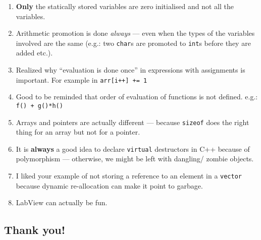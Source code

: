 \documentclass[11pt]{report}
\begin{document}
\begin{enumerate}
	\item \textbf{Only} the statically stored variables are zero initialised and not all the variables.
	\item Arithmetic promotion is done \emph{always} --- even when the types of the variables involved are the same (e.g.: two \texttt{char}s are promoted to \texttt{int}s before they are added etc.).
	\item Realized why ``evaluation is done once'' in expressions with assignments is important. For example in \texttt{arr[i++] += 1}
	\item Good to be reminded that order of evaluation of functions is not defined. e.g.: \texttt{f() + g()*h()}
	\item Arrays and pointers are actually different --- because \texttt{sizeof} does the right thing for an array but not for a pointer.
	\item It is \textbf{always} a good idea to declare \texttt{virtual} destructors in C++ because of polymorphism --- otherwise, we might be left with dangling/ zombie objects.
	\item I liked your example of not storing a reference to an element in a \texttt{vector} because dynamic re-allocation can make it point to garbage.
	\item LabView can actually be fun.
\end{enumerate}

\subsection*{Thank you!}
\end{document}
